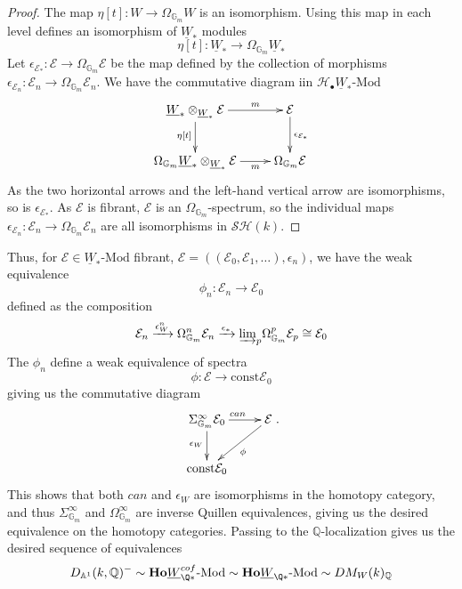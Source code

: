 \documentclass[a4paper,12pt,draft]{amsart}
\theoremstyle{definition}
\theoremstyle{remark}
\begin{document}
\begin{proof} The map $\eta[t]:W\to \Omega_{{{\mathbb G}}_m}W$ is an isomorphism. Using this map in each level defines an isomorphism of $ \underline{W}_*$ modules
\[
\eta[t]: \underline{W}_*\to \Omega_{{{\mathbb G}}_m} \underline{W}_*
\]
Let $\epsilon_{{{\mathcal E}}_*}:{{\mathcal E}}\to \Omega_{{{\mathbb G}}_m}{{\mathcal E}}$ be the map defined by the collection of morphisms $\epsilon_{{{\mathcal E}}_n}:{{\mathcal E}}_n\to \Omega_{{{\mathbb G}}_m}{{\mathcal E}}_n$. We have the commutative diagram iin ${{\mathcal{H}_{\bullet}}}  \underline{W}_*\text{-Mod}$
\[
\xymatrix{
\underline{W}_*\otimes_{\underline{W}_*}{{\mathcal E}}\ar[r]^-m\ar[d]_{\eta[t]}&{{\mathcal E}}\ar[d]^{\epsilon_{{{\mathcal E}}_*}}\\
\Omega_{{{\mathbb G}}_m}\underline{W}_*\otimes_{\underline{W}_*}{{\mathcal E}}\ar[r]_-m&\Omega_{{{\mathbb G}}_m}{{\mathcal E}}}
\]
As the two horizontal arrows and the left-hand vertical arrow are isomorphisms, so is $\epsilon_{{{\mathcal E}}_*}$. As ${{\mathcal E}}$ is fibrant, ${{\mathcal E}}$ is an $\Omega_{{{\mathbb G}}_m}$-spectrum, so the individual maps $\epsilon_{{{\mathcal E}}_n}:{{\mathcal E}}_n\to \Omega_{{{\mathbb G}}_m}{{\mathcal E}}_n$ are all isomorphisms in ${\mathcal{SH}}(k)$.
\end{proof}

Thus, for ${{\mathcal E}}\in  \underline{W}_{*}\text{-Mod}$ fibrant, ${{\mathcal E}}=(({{\mathcal E}}_0,{{\mathcal E}}_1,\ldots), \epsilon_n)$, we have the weak equivalence
\[
\phi_n:{{\mathcal E}}_n\to {{\mathcal E}}_0
\]
defined as the composition
\[
{{\mathcal E}}_n\xrightarrow{\epsilon_W^n}\Omega^n_{{{\mathbb G}}_m}{{\mathcal E}}_n\xrightarrow{\epsilon_*}{\operatornamewithlimits{\varinjlim}}_p\Omega^p_{{{\mathbb G}}_m}{{\mathcal E}}_p\cong {{\mathcal E}}_0
\]
The $\phi_n$ define a  weak equivalence of spectra
\[
\phi:{{\mathcal E}}\to \text{const}{{\mathcal E}}_0
\]
giving us the commutative  diagram
\[
\xymatrix{ 
\Sigma^\infty_{{{\mathbb G}}_m}{{\mathcal E}}_0\ar[r]^{can}\ar[d]_{\epsilon_W}&{{\mathcal E}}\ar[dl]^\phi\\\text{const}{{\mathcal E}}_0}.
\]
This shows that both $can$ and $\epsilon_W$ are isomorphisms in the homotopy category, and thus $\Sigma^\infty_{{{\mathbb G}}_m}$ and $\Omega^\infty_{{{\mathbb G}}_m}$ are inverse Quillen equivalences, giving us the desired equivalence on the homotopy categories.
Passing to the ${{\mathbb Q}}$-localization gives us the desired sequence of equivalences
\[
D_{{{\mathbb A}}^1}(k,{{\mathbb Q}})^-\sim  {{\mathbf{Ho}}} \underline{W}^{cof}_{\Q*}\text{-Mod}\sim  {{\mathbf{Ho}}} \underline{W}_{\Q*}\text{-Mod}\sim DM_W(k)_{{\mathbb Q}}
\]
\end{document}
